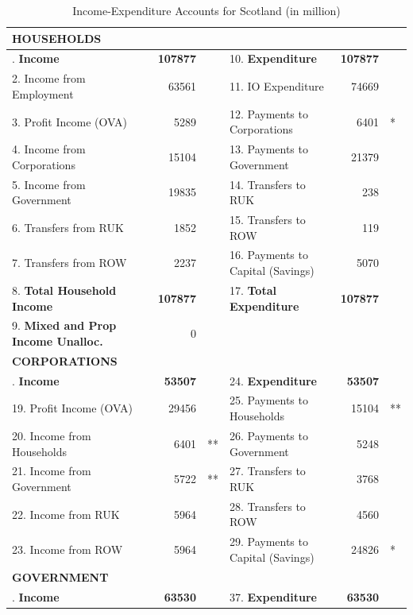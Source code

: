 \begin{table}[H] \caption{Income-Expenditure Accounts for Scotland (in \textsterling million)}
\bigskip \begin{scriptsize} \begin{centering} \begin{spacing}{1.2}
    \begin{tabular}{lrllrl}
          \toprule
    \textbf{HOUSEHOLDS} \bigstrut\\
   \hline  
\bigstrut[t]    1. \textbf{Income} & \textbf{107877} & & 10. \textbf{Expenditure} & \textbf{107877} & \\
    2. Income from Employment & 63561  &   & 11. IO Expenditure & 74669 & \\
    3. Profit Income (OVA) & 5289 & & 12. Payments to Corporations & 6401 &* \\
    4. Income from Corporations & 15104 & & 13. Payments to Government & 21379 & \\
    5. Income from Government & 19835 & & 14. Transfers to RUK & 238 & \\
    6. Transfers from RUK & 1852 & & 15. Transfers to ROW & 119 & \\
    7. Transfers from ROW & 2237 & & 16. Payments to Capital (Savings) & 5070 &\\
    8. \textbf{Total Household Income} & \textbf{107877} & & 17. \textbf{Total Expenditure} & \textbf{107877} & \\
    9. \textbf{Mixed and Prop Income Unalloc.} & 0 & \bigstrut[b]\\
    \hline
\bigstrut[t]    \textbf{CORPORATIONS} \bigstrut\\
    \hline
\bigstrut[t] 18. \textbf{Income} & \textbf{53507}  &   & 24. \textbf{Expenditure} & \textbf{53507} & \\
       19. Profit Income (OVA) & 29456 & & 25. Payments to Households & 15104 &** \\
       20. Income from Households & 6401 &** & 26. Payments to Government & 5248 & \\
       21. Income from Government & 5722 &** & 27. Transfers to RUK & 3768 & \\
       22. Income from RUK & 5964 & & 28. Transfers to ROW & 4560 & \\
       23. Income from ROW & 5964 & & 29. Payments to Capital (Savings) & 24826 &* \\
    \hline
    \textbf{GOVERNMENT} \bigstrut\\
    \hline
\bigstrut[t]       30. \textbf{Income} & \textbf{63530}  &   & 37. \textbf{Expenditure} & \textbf{63530} & \\

\end{tabular}
\end{spacing}
\end{centering}
\end{scriptsize}
\end{table}
